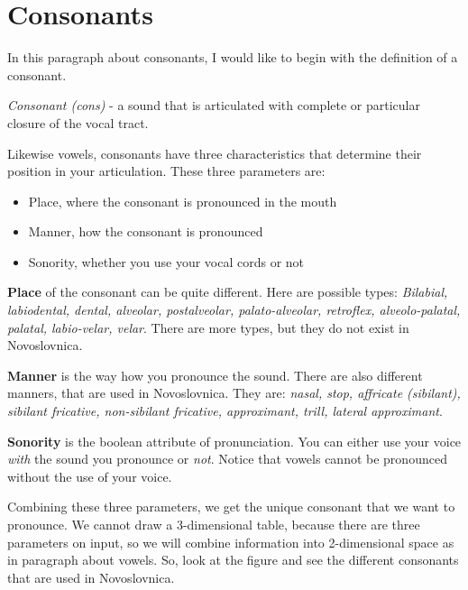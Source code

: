\section{Consonants}

In this paragraph about consonants, I would like to begin with the definition of a consonant.


\textit{Consonant (\gls{cons})} - a sound that is articulated with complete or particular closure of the vocal tract. 

Likewise vowels, consonants have three characteristics that determine their position in your articulation. These three parameters are:

\begin{itemize}
	\item{Place, where the consonant is pronounced in the mouth}
	\item{Manner, how the consonant is pronounced }
	\item{Sonority, whether you use your vocal cords or not}
\end{itemize}

\textbf{Place} of the consonant can be quite different. Here are possible types: \textit{Bilabial, labiodental, dental, alveolar, postalveolar, palato-alveolar, retroflex, alveolo-palatal, palatal, labio-velar, velar}. There are more types, but they do not exist in Novoslovnica.

\textbf{Manner} is the way how you pronounce the sound. There are also different manners, that are used in Novoslovnica. They are: \textit{nasal, stop, affricate (sibilant), sibilant fricative, non-sibilant fricative, approximant, trill, lateral approximant}.

\textbf{Sonority} is the boolean attribute of pronunciation. You can either use your voice \textit{with} the sound you pronounce or \textit{not}. Notice that vowels cannot be pronounced without the use of your voice. 

Combining these three parameters, we get the unique consonant that we want to pronounce. We cannot draw  a 3-dimensional table, because there are three parameters on input, so we will combine information into 2-dimensional space as in paragraph about vowels. So, look at the figure and see the different consonants that are used in Novoslovnica.

